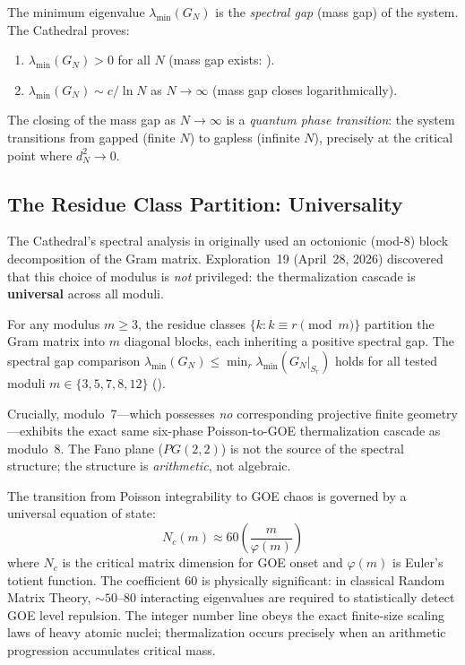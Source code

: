 \documentclass[11pt,a4paper]{article}
\begin{document}
\begin{correspondence}[Spectral Gap = Mass Gap]
The minimum eigenvalue $\lambda_{\min}(G_N)$ is the \emph{spectral gap}
(mass gap) of the system. The Cathedral proves:
\begin{enumerate}
  \item $\lambda_{\min}(G_N) > 0$ for all $N$ (mass gap exists:
    ).
  \item $\lambda_{\min}(G_N) \sim c/\ln N$ as $N \to \infty$
    (mass gap closes logarithmically).
\end{enumerate}
The closing of the mass gap as $N \to \infty$ is a \emph{quantum
phase transition}: the system transitions from gapped (finite $N$)
to gapless (infinite $N$), precisely at the critical point where
$d_N^2 \to 0$.
\end{correspondence}

\subsection{The Residue Class Partition: Universality}
\label{sec:universality}

The Cathedral's spectral analysis in 
originally used an octonionic (mod-8) block decomposition of the Gram matrix.
Exploration~19 (April~28, 2026) discovered that this choice of modulus is
\emph{not} privileged: the thermalization cascade is \textbf{universal}
across all moduli.

\begin{principle}
For any modulus $m \geq 3$, the residue classes $\{k : k \equiv r \pmod{m}\}$
partition the Gram matrix into $m$ diagonal blocks, each inheriting a positive
spectral gap. The spectral gap comparison
$\lambda_{\min}(G_N) \leq \min_r \lambda_{\min}(G_N|_{S_r})$
holds for all tested moduli $m \in \{3, 5, 7, 8, 12\}$
().

Crucially, modulo~7---which possesses \emph{no} corresponding projective
finite geometry---exhibits the exact same six-phase Poisson-to-GOE
thermalization cascade as modulo~8. The Fano plane ($PG(2,2)$) is not
the source of the spectral structure; the structure is \emph{arithmetic},
not algebraic.

The transition from Poisson integrability to GOE chaos is governed by a
universal equation of state:
\begin{equation}
  N_c(m) \approx 60 \left(\frac{m}{\varphi(m)}\right)
  \label{eq:universality}
\end{equation}
where $N_c$ is the critical matrix dimension for GOE onset and $\varphi(m)$
is Euler's totient function. The coefficient $60$ is physically significant:
in classical Random Matrix Theory, $\sim 50$--$80$ interacting eigenvalues
are required to statistically detect GOE level repulsion. The integer number
line obeys the exact finite-size scaling laws of heavy atomic nuclei;
thermalization occurs precisely when an arithmetic progression
accumulates critical mass.
\end{principle}
\end{document}
